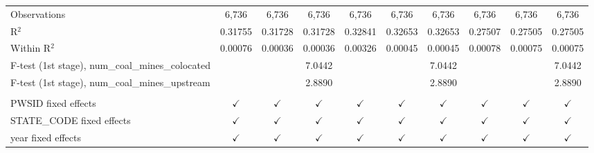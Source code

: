 \begin{table}[htbp]
\begin{adjustbox}{width = \textwidth, center}
\begin{tabular}{lccccccccc}
          \\
         Observations                                       & 6,736         & 6,736         & 6,736         & 6,736           & 6,736         & 6,736         & 6,736         & 6,736         & 6,736\\  
         R$^2$                                              & 0.31755       & 0.31728       & 0.31728       & 0.32841         & 0.32653       & 0.32653       & 0.27507       & 0.27505       & 0.27505\\  
         Within R$^2$                                       & 0.00076       & 0.00036       & 0.00036       & 0.00326         & 0.00045       & 0.00045       & 0.00078       & 0.00075       & 0.00075\\  
         F-test (1st stage), num\_coal\_mines\_colocated    &               &               & 7.0442        &                 &               & 7.0442        &               &               & 7.0442\\  
         F-test (1st stage), num\_coal\_mines\_upstream     &               &               & 2.8890        &                 &               & 2.8890        &               &               & 2.8890\\  
          \\
         PWSID fixed effects                                & $\checkmark$  & $\checkmark$  & $\checkmark$  & $\checkmark$    & $\checkmark$  & $\checkmark$  & $\checkmark$  & $\checkmark$  & $\checkmark$\\   
         STATE\_CODE fixed effects                          & $\checkmark$  & $\checkmark$  & $\checkmark$  & $\checkmark$    & $\checkmark$  & $\checkmark$  & $\checkmark$  & $\checkmark$  & $\checkmark$\\   
         year fixed effects                                 & $\checkmark$  & $\checkmark$  & $\checkmark$  & $\checkmark$    & $\checkmark$  & $\checkmark$  & $\checkmark$  & $\checkmark$  & $\checkmark$\\   
         \bottomrule
      \end{tabular}
   \end{adjustbox}
\end{table}


